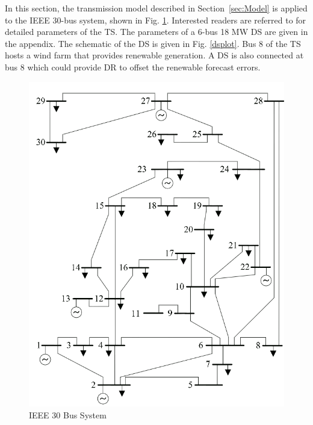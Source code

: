In this section, the transmission model described in Section~\ref{sec:Model} is applied to the IEEE 30-bus system, shown in Fig.
\ref{fig:wee}. Interested readers are referred to \cite{zimmerman2009matpower} for
detailed parameters of the TS. The parameters of a 6-bus 18 MW DS are given in the appendix. The schematic of the DS is given in Fig. \ref{dsplot}. Bus 8 of the TS hosts a wind farm that provides renewable generation. A DS is also connected at bus 8 which could provide DR to offset the renewable forecast errors. 
\begin{figure}[H]
\centering
\includegraphics[scale=0.4]{IEEE_30bus.png}
\caption{IEEE 30 Bus System}
\label{fig:wee}
\end{figure}

